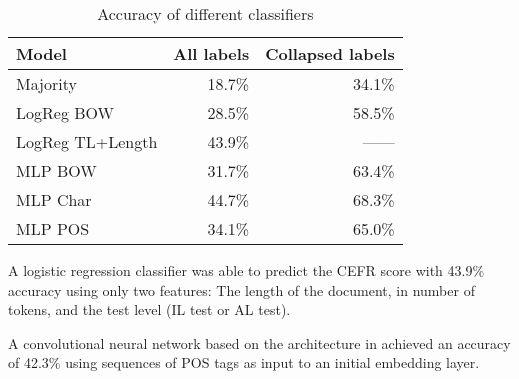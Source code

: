 \begin{table}
  \centering
  \begin{tabular}{lrr}
    \toprule
    Model            & All labels & Collapsed labels \\
    \midrule
    Majority         &     18.7\% &           34.1\% \\
    LogReg BOW       &     28.5\% &           58.5\% \\
    LogReg TL+Length &     43.9\% &           ------ \\
    MLP BOW          &     31.7\% &           63.4\% \\
    MLP Char         &     44.7\% &           68.3\% \\
    MLP POS          &     34.1\% &           65.0\% \\
    \bottomrule
  \end{tabular}
  \caption{Accuracy of different classifiers}
  \label{baseline-accuracies}
\end{table}

A logistic regression classifier was able to predict the CEFR score with
43.9\% accuracy using only two features: The length of the document, in
number of tokens, and the test level (IL test or AL test).

A convolutional neural network based on the architecture in
\textcite{zhang2017sensitivity} achieved an accuracy of 42.3\% using
sequences of POS tags as input to an initial embedding layer.
